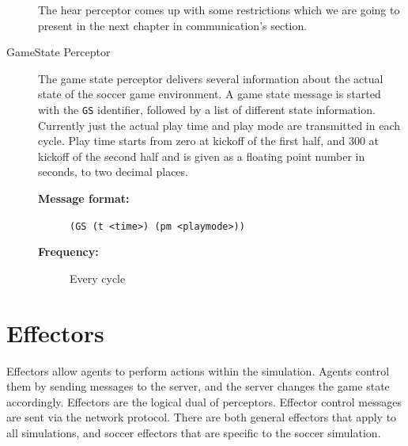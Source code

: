 \begin{description}
The hear perceptor comes up with some restrictions which we are going to present in the next chapter in communication's section.
  
  
    \item [GameState Perceptor]
  The game state perceptor delivers several information about the actual state of the soccer game environment. A game state message is started with the \texttt{GS} identifier, followed by a list of different state information. Currently just the actual play time and play mode are transmitted in each cycle. Play time starts from zero at kickoff of the first half, and 300 at kickoff of the second half and is given as a floating point number in seconds, to two decimal places.
     \begin{description}
  \item[{\bf Message format:}]
  \texttt{(GS (t <time>) (pm <playmode>))}
  \item[{\bf Frequency:}]
 Every cycle
  \end{description}

\end{description}
\section{Effectors}

Effectors allow agents to perform actions within the simulation. Agents control them by sending messages to the server, and the server changes the game state accordingly. Effectors are the logical dual of perceptors.
Effector control messages are sent via the network protocol. There are both general effectors that apply to all simulations, and soccer effectors that are specific to the soccer simulation.\\
